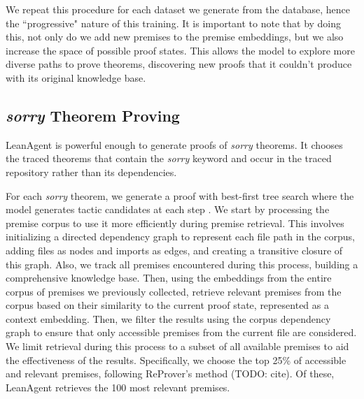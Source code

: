 \documentclass{article} %
\begin{document}
We repeat this procedure for each dataset we generate from the database, hence the ``progressive" nature of this training. It is important to note that by doing this, not only do we add new premises to the premise embeddings, but we also increase the space of possible proof states. This allows the model to explore more diverse paths to prove theorems, discovering new proofs that it couldn't produce with its original knowledge base.

\subsection{\textit{sorry} Theorem Proving}

LeanAgent is powerful enough to generate proofs of \textit{sorry} theorems. It chooses the traced theorems that contain the \textit{sorry} keyword and occur in the traced repository rather than its dependencies.


For each \textit{sorry} theorem, we generate a proof with best-first tree search where the model generates tactic candidates at each step \citep{hanProofArtifactCotraining2021, jiangThorWieldingHammers2022, poluFormalMathematicsStatement2022, zhengMiniF2FCrosssystemBenchmark2021}. We start by processing the premise corpus to use it more efficiently during premise retrieval. This involves initializing a directed dependency graph to represent each file path in the corpus, adding files as nodes and imports as edges, and creating a transitive closure of this graph. Also, we track all premises encountered during this process, building a comprehensive knowledge base. Then, using the embeddings from the entire corpus of premises we previously collected, retrieve relevant premises from the corpus based on their similarity to the current proof state, represented as a context embedding. Then, we filter the results using the corpus dependency graph to ensure that only accessible premises from the current file are considered. We limit retrieval during this process to a subset of all available premises to aid the effectiveness of the results. Specifically, we choose the top 25\% of accessible and relevant premises, following ReProver's method (TODO: cite). Of these, LeanAgent retrieves the 100 most relevant premises.
\end{document}
